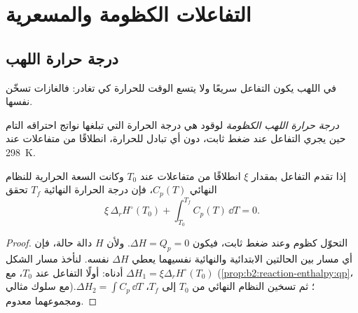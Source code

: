 \section{التفاعلات الكظومة والمسعرية}

\subsection*{درجة حرارة اللهب}

في اللهب يكون التفاعل سريعًا ولا يتسع الوقت للحرارة كي تغادر: فالغازات
تسخّن نفسها.

\begin{definition}\label{def:b2:reaction-enthalpy:flame-temperature}
\emph{درجة حرارة اللهب الكظومة} لوقود هي
درجة الحرارة التي تبلغها نواتج احتراقه التام حين يجري التفاعل عند ضغط
ثابت، دون أي تبادل للحرارة، انطلاقًا من متفاعلات عند \qty{298}{K}.
\end{definition}

\begin{proposition}\label{prop:b2:reaction-enthalpy:flame}
إذا تقدم التفاعل بمقدار $\xi$ انطلاقًا من متفاعلات عند $T_0$ وكانت
السعة الحرارية للنظام النهائي $C_p(T)$، فإن درجة الحرارة النهائية $T_f$
تحقق
\[
  \xi\,\Delta_r H^\circ(T_0) + \int_{T_0}^{T_f}C_p(T)\,\dd T = 0 .
\]
\end{proposition}

\begin{proof}
التحوّل كظوم وعند ضغط ثابت، فيكون $\Delta H =
Q_p = 0$. ولأن $H$ دالة حالة، فإن أي مسار بين الحالتين الابتدائية
والنهائية نفسيهما يعطي $\Delta H$ نفسه. لنأخذ مسار الشكل أدناه: أولًا
التفاعل عند $T_0$، مع
$\Delta H_1 = \xi\Delta_r H^\circ(T_0)$ (\cref{prop:b2:reaction-enthalpy:qp}،
مع سلوك مثالي)؛ ثم تسخين النظام النهائي من $T_0$ إلى
$T_f$، $\Delta H_2 = \int C_p\,\dd T$. ومجموعهما معدوم.
\end{proof}

